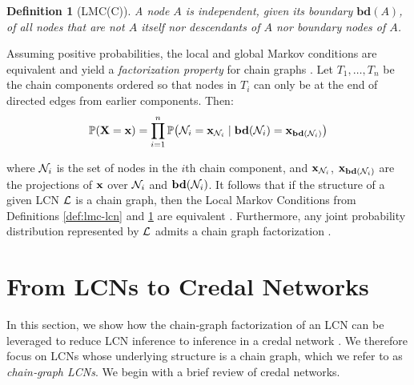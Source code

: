 \documentclass{article}
\newtheorem{definition}{Definition}
\newcommand{\pr}[1]{\mathbb{P}\!\left( #1 \right)}
\begin{document}
\begin{definition}[LMC(C)]\label{def:lmc-cg}
    A node $A$ is independent, given its boundary $\mathbf{bd}(A)$, of all nodes that are not $A$ itself nor descendants of $A$ nor boundary nodes of $A$.
\end{definition}

Assuming positive probabilities, the local and global Markov conditions are equivalent and yield a \emph{factorization property} for chain graphs \cite{cowell99,cozman23a}. Let $T_1, \dots, T_n$ be the chain components ordered so that nodes in $T_i$ can only be at the end of directed edges from earlier components. Then:
\begin{equation}\label{eq:factorization}
\pr{\bX=\bx} = \prod_{i=1}^n \pr{\cN_i=\bx_{\cN_i}\mid\mathbf{bd}(\cN_i)=\bx_{\mathbf{bd}(\cN_i)}}
\end{equation}

where $\mathcal{N}_i$ is the set of nodes in the $i$th chain component, and $\mathbf{x}_{\mathcal{N}_i}$, $\mathbf{x}_{\mathbf{bd}(\mathcal{N}_i)}$ are the projections of $\mathbf{x}$ over $\mathcal{N}_i$ and $\mathbf{bd}(\mathcal{N}_i)$. It follows that if the structure of a given LCN $\mathcal{L}$ is a chain graph, then the Local Markov Conditions from Definitions \ref{def:lmc-lcn} and \ref{def:lmc-cg} are equivalent \cite{cozman23a}. Furthermore, any joint probability distribution represented by $\mathcal{L}$ admits a chain graph factorization \cite{cozman23a}.


\section{From LCNs to Credal Networks}
\label{sec-lcn-to-credal}

In this section, we show how the chain‑graph factorization of an LCN can be leveraged to reduce LCN inference to inference in a credal network \cite{cozman2000credal}. We therefore focus on LCNs whose underlying structure is a chain graph, which we refer to as \emph{chain‑graph LCNs}. We begin with a brief review of credal networks.
\end{document}
